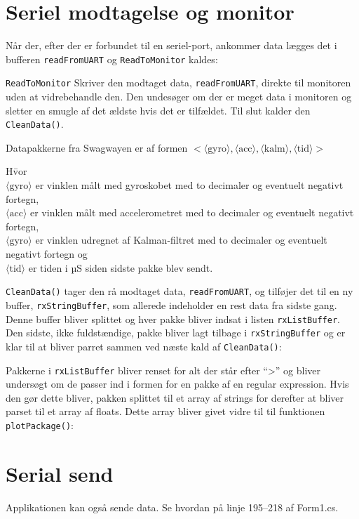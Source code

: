 \documentclass[a4paper,oneside,article,danish,table]{memoir}
\newcommand{\form}[2]{}
\begin{document}
\section{Seriel modtagelse og monitor}
Når der, efter der er forbundet til en seriel-port, ankommer data lægges det i bufferen \texttt{readFromUART} og \texttt{ReadToMonitor} kaldes:
\form{131}{136}
\texttt{ReadToMonitor} Skriver den modtaget data, \texttt{readFromUART}, direkte til monitoren uden at vidrebehandle den. Den undesøger om der er meget data i monitoren og sletter en smugle af det ældste hvis det er tilfældet. Til slut kalder den \texttt{CleanData()}.
\form{138}{149}
Datapakkerne fra Swagwayen er af formen $<\langle \text{gyro} \rangle,\langle \text{acc} \rangle,\langle \text{kalm} \rangle,\langle \text{tid} \rangle>$
\begin{tabbing}
H\=vor\\
\> $\langle \text{gyro} \rangle$ er vinklen målt med gyroskobet med to decimaler og eventuelt negativt fortegn,\\
\> $\langle \text{acc} \rangle$ er vinklen målt med accelerometret med to decimaler og eventuelt negativt fortegn,\\
\> $\langle \text{gyro} \rangle$ er vinklen udregnet af Kalman-filtret  med to decimaler og eventuelt negativt fortegn og\\
\> $\langle \text{tid} \rangle$ er tiden i µS siden sidste pakke blev sendt.
\end{tabbing}
\texttt{CleanData()} tager den rå modtaget data, \texttt{readFromUART}, og tilføjer det til en ny buffer, \texttt{rxStringBuffer}, som allerede indeholder en rest data fra sidste gang. Denne buffer bliver splittet og hver pakke bliver indsat i listen \texttt{rxListBuffer}. Den sidste, ikke fuldstændige, pakke bliver lagt tilbage i \texttt{rxStringBuffer} og er klar til at bliver parret sammen ved næste kald af \texttt{CleanData()}:
\form{151}{157}
Pakkerne i \texttt{rxListBuffer} bliver renset for alt der står efter “>” og bliver undersøgt om de passer ind i formen for en pakke af en regular expression. Hvis den gør dette bliver, pakken splittet til et array af strings for derefter at bliver parset til et array af floats. Dette array bliver givet vidre til til funktionen \texttt{plotPackage()}:
\form{159}{189}

\section{Serial send}
Applikationen kan også sende data. Se hvordan på linje 195--218 af Form1.cs.
\end{document}

